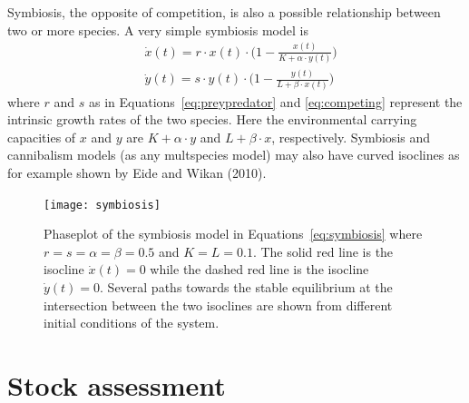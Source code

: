 \documentclass[11pt,fleqn]{book} %
\begin{document}
Symbiosis, the opposite of competition, is also a possible relationship between two or more species. A very simple symbiosis model is
\begin{equation}
\label{eq:symbiosis}
\begin{aligned} & \dot{x}(t) = r \cdot x(t) \cdot \bigg(1 - \frac{x(t)}{K + \alpha \cdot y(t)}\bigg) \\
& \dot{y}(t) = s \cdot y(t) \cdot \bigg(1 - \frac{y(t)}{L + \beta \cdot x(t)}\bigg)
\end{aligned}
\end{equation}
where $r$ and $s$ as in Equations~\ref{eq:preypredator} and \ref{eq:competing} represent the intrinsic growth rates of the two species. Here the environmental carrying capacities of $x$ and $y$ are $K + \alpha \cdot y$ and $L + \beta \cdot x$, respectively. Symbiosis and cannibalism models (as any multspecies model) may also have curved isoclines as for example shown by Eide and Wikan (2010)\cite{Eide2010}.

\begin{figure}[ht]
\centering
\texttt{[image: symbiosis]}
\caption{Phaseplot of the symbiosis model in Equations~\ref{eq:symbiosis} where $r = s = \alpha = \beta =0.5$ and $K = L = 0.1$. The solid red line is the isocline $ \dot{x}(t) = 0$ while the dashed red line is the isocline $ \dot{y}(t) = 0$. Several paths towards the stable equilibrium at the intersection between the two isoclines are shown from different initial conditions of the system.\\}
\label{fig:symbiosis}
\end{figure}

\begin{figure}[!htb]\end{figure}

\section{Stock assessment}\label{section:assessment}
\end{document}
